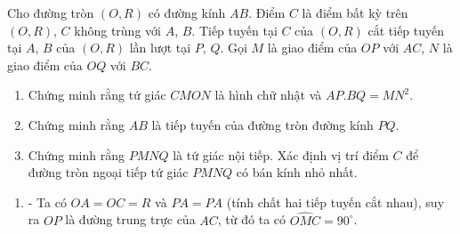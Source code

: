 \begin{ex}%
Cho đường tròn $(O,R)$ có đường kính $AB$. Điểm $C$ là điểm bất kỳ trên $(O,R)$, $C$ không trùng với $A$, $B$. Tiếp tuyến tại $C$ của $(O,R)$ cắt tiếp tuyến tại $A$, $B$ của $(O,R)$ lần lượt tại $P$, $Q$. Gọi $M$ là giao điểm của $OP$ với $AC$, $N$ là giao điểm của $OQ$ với $BC$. 
    \begin{enumerate}
        \item Chứng minh rằng tứ giác $CMON$ là hình chữ nhật và $AP.BQ=MN^2$.
        \item Chứng minh rằng $AB$ là tiếp tuyến của đường tròn đường kính $PQ$.
        \item Chứng minh rằng $PMNQ$ là tứ giác nội tiếp. Xác định vị trí điểm $C$ để đường tròn ngoại tiếp tứ giác $PMNQ$ có bán kính nhỏ nhất.
    \end{enumerate}
\loigiai
    {\begin{enumerate} 
        \item - Ta có $OA=OC=R$ và $PA=PA$ (tính chất hai tiếp tuyến cắt nhau), suy ra $OP$ là đường trung trực của $AC$, từ đó ta có $\widehat{OMC}=90^\circ$.         
\end{enumerate}}
\end{ex}
